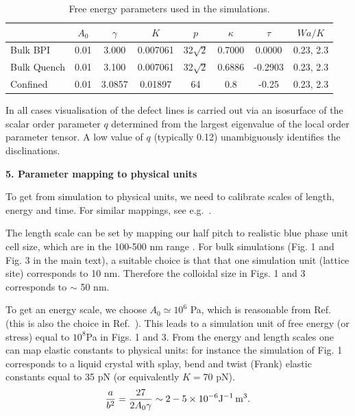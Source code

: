 \documentclass[12pt,twoside]{article}
\begin{document}
\begin{table}
\begin{center}
\begin{tabular}{|l|c|c|c|c|c|c|c|}
\hline
         & $A_0$ & $\gamma$ & $K$ & $p$ & $\kappa$ & $\tau$ & $Wa/K$\\
\hline 
Bulk BPI & 0.01 & 3.000 & 0.007061 & 32$\sqrt{2}$ & 0.7000 & 0.0000 &
0.23, 2.3\\
\hline
Bulk Quench & 0.01 & 3.100 & 0.007061 & 32$\sqrt{2}$ & 0.6886 & -0.2903 &
0.23, 2.3 \\
\hline
Confined & 0.01 & 3.0857 & 0.01897 & 64 & 0.8 & -0.25 & 0.23, 2.3\\
\hline
\end{tabular}
\end{center}
\caption{Free energy parameters used in the simulations.}
\label{table:params}
\end{table}

In all cases visualisation of the defect lines is carried out via
an isosurface of the scalar order parameter $q$ determined from the
largest eigenvalue of the local order parameter tensor. A low value
of $q$ (typically 0.12) unambiguously identifies the disclinations.

{\bf 5. Parameter mapping to physical units}

To get from simulation to physical units, we need to calibrate scales of length,
energy and time. For similar mappings, see e.g.~\cite{denniston2}.

The length scale can be set by mapping our half pitch to realistic blue phase
unit cell size, which are in the 100-500 nm range \cite{blue1}. 
For bulk simulations (Fig. 1 and Fig. 3 in the main text), a suitable choice
is that that one simulation unit (lattice site) corresponds to 10 nm. Therefore
the colloidal size in Figs. 1 and 3 corresponds to $\sim$ 50 nm. 

To get an energy scale, we choose $A_0 \simeq 10^6$ Pa, which is 
reasonable from Ref.~\cite{blue1} (this is also the choice in
Ref.~\cite{oliver2}). This leads to a simulation unit of
free energy (or stress) equal to $10^{8}$Pa in Figs. 1 and 3.
From the energy and length scales one can map elastic constants to
physical units: for instance the simulation of Fig. 1 corresponds to
a liquid crystal with splay, bend and twist (Frank) elastic constants
equal to 35 pN (or equivalently $K=$70 pN).
\begin{equation}
\frac{a}{b^2} = \frac{27}{2 A_0\gamma} \sim 2-5 \times 10^{-6}
{\rm J}^{-1}\, {\rm m}^{3}.
\end{equation}
\end{document}
